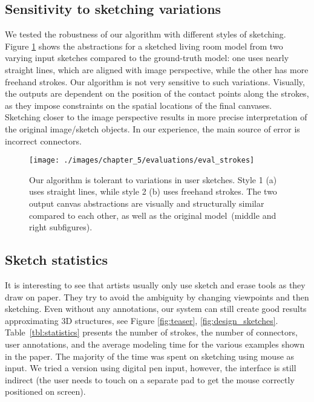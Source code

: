 \subsection{Sensitivity to sketching variations}  We tested the robustness of our algorithm with different styles of sketching. Figure \ref{fig:strokes_eval} shows the abstractions for a sketched living room model from two varying input sketches compared to the ground-truth model: one uses nearly straight lines, which are aligned with image perspective, while the other has more freehand strokes. Our algorithm is not very sensitive to such variations. Visually, the outputs are dependent on the position of the contact points along the strokes, as they impose constraints on the spatial locations of the final canvases. Sketching closer to the image perspective results in more precise interpretation of the original image/sketch objects.
%
In our experience, the main source of error is incorrect connectors.%

\begin{figure}[h!]
  \centering
  \texttt{[image: ./images/chapter\_5/evaluations/eval\_strokes]}
  \caption[Our algorithm is tolerant to variations in user sketches.]{Our algorithm is tolerant to variations in user sketches. Style 1 (a) uses straight lines, while style 2 (b) uses freehand strokes. The two output canvas abstractions are visually and structurally similar compared to each other, as well as the original model~(middle and right subfigures).
  }
  \label{fig:strokes_eval}
\end{figure}

\subsection{Sketch statistics} It is interesting to see that artists usually only use sketch and erase tools as they draw on paper. They try to avoid the ambiguity by changing viewpoints and then sketching. Even without any annotations, our system can still create good results approximating 3D structures, see Figure \ref{fig:teaser}, \ref{fig:design_sketches}. Table~\ref{tbl:statistics} presents the number of strokes, the number of connectors, user annotations, and the average modeling time for the various examples shown in the paper. The majority of the time was spent on sketching using mouse as input. We tried a version using digital pen input, however, the interface is still indirect (the user needs to touch on a separate pad to get the mouse correctly positioned on screen).


